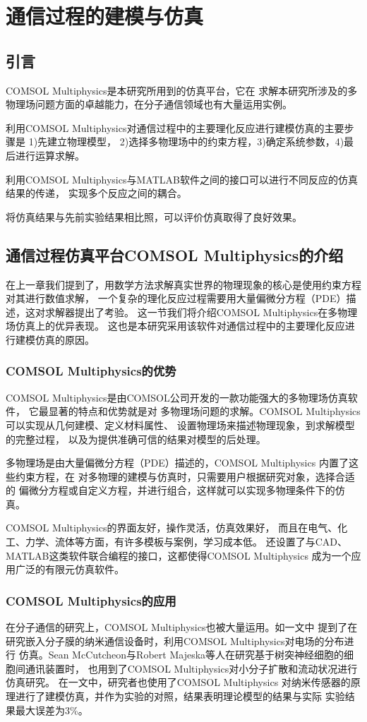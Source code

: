 \chapter{通信过程的建模与仿真}
\section{引言}
COMSOL Multiphysics是本研究所用到的仿真平台，它在
求解本研究所涉及的多物理场问题方面的卓越能力，在分子通信领域也有大量运用实例。

利用COMSOL Multiphysics对通信过程中的主要理化反应进行建模仿真的主要步骤是
1)先建立物理模型，
2)选择多物理场中的约束方程，3)确定系统参数，4)最后进行运算求解。

利用COMSOL Multiphysics与MATLAB软件之间的接口可以进行不同反应的仿真结果的传递，
实现多个反应之间的耦合。

将仿真结果与先前实验结果相比照，可以评价仿真取得了良好效果。
\section{通信过程仿真平台COMSOL Multiphysics的介绍}
在上一章我们提到了，用数学方法求解真实世界的物理现象的核心是使用约束方程对其进行数值求解，
一个复杂的理化反应过程需要用大量偏微分方程（PDE）描述，这对求解器提出了考验。
这一节我们将介绍COMSOL Multiphysics在多物理场仿真上的优异表现。
这也是本研究采用该软件对通信过程中的主要理化反应进行建模仿真的原因。
\subsection{COMSOL Multiphysics的优势}
COMSOL Multiphysics是由COMSOL公司开发的一款功能强大的多物理场仿真软件，
它最显著的特点和优势就是对
多物理场问题的求解\cite{李淑君2014基于}。COMSOL Multiphysics
可以实现从几何建模、定义材料属性、
设置物理场来描述物理现象，到求解模型的完整过程，
以及为提供准确可信的结果对模型的后处理。

多物理场是由大量偏微分方程（PDE）描述的，COMSOL Multiphysics
内置了这些约束方程，在
对多物理的建模与仿真时，只需要用户根据研究对象，选择合适的
偏微分方程或自定义方程，并进行组合，这样就可以实现多物理条件下的仿真\cite{王瑞2013基于}。

COMSOL Multiphysics的界面友好，操作灵活，仿真效果好，
而且在电气、化工、力学、流体等方面，有许多模板与案例，学习成本低。
还设置了与CAD、MATLAB这类软件联合编程的接口，这都使得COMSOL Multiphysics
成为一个应用广泛的有限元仿真软件。
\subsection{COMSOL Multiphysics的应用}
在分子通信的研究上，COMSOL Multiphysics也被大量运用。如\parencite{10.1007/978-3-319-67380-6_19}一文中
提到了在研究嵌入分子膜的纳米通信设备时，利用COMSOL Multiphysics对电场的分布进行
仿真。Sean McCutcheon与Robert Majeska等人在研究基于树突神经细胞的细胞间通讯装置时，
也用到了COMSOL Multiphysics对小分子扩散和流动状况进行仿真研究\cite{McCutcheon2017}。
在\parencite{10.1007/978-81-322-1007-8_56}一文中，研究者也使用了COMSOL Multiphysics
对纳米传感器的原理进行了建模仿真，并作为实验的对照，结果表明理论模型的结果与实际
实验结果最大误差为3\%。





